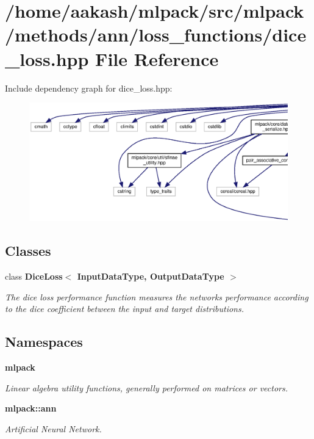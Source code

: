 \section{/home/aakash/mlpack/src/mlpack/methods/ann/loss\+\_\+functions/dice\+\_\+loss.hpp File Reference}
\label{dice__loss_8hpp}
Include dependency graph for dice\+\_\+loss.\+hpp\+:
\nopagebreak
\begin{figure}[H]
\begin{center}
\leavevmode
\includegraphics[width=350pt]{dice__loss_8hpp__incl}
\end{center}
\end{figure}
\subsection*{Classes}
\begin{DoxyCompactItemize}
\item 
class \textbf{ Dice\+Loss$<$ Input\+Data\+Type, Output\+Data\+Type $>$}
\begin{DoxyCompactList}\small\item\em The dice loss performance function measures the network\textquotesingle{}s performance according to the dice coefficient between the input and target distributions. \end{DoxyCompactList}\end{DoxyCompactItemize}
\subsection*{Namespaces}
\begin{DoxyCompactItemize}
\item 
 \textbf{ mlpack}
\begin{DoxyCompactList}\small\item\em Linear algebra utility functions, generally performed on matrices or vectors. \end{DoxyCompactList}\item 
 \textbf{ mlpack\+::ann}
\begin{DoxyCompactList}\small\item\em Artificial Neural Network. \end{DoxyCompactList}\end{DoxyCompactItemize}


